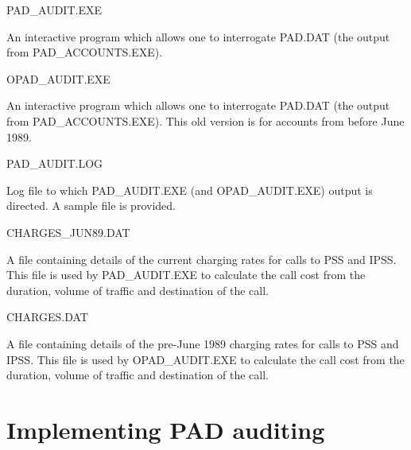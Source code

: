 \begin{list}{}{\setlength{\labelwidth}{\numlen}
\setlength{\leftmargin}{\numlen}
\addtolength{\leftmargin}{\labelsep}}
\item[PAD\_\/AUDIT.EXE]

An interactive program which allows one to
interrogate PAD.DAT (the output from 
PAD\_\/ACCOUNTS.EXE).

\item [OPAD\_\/AUDIT.EXE]

An interactive program which allows one to
interrogate PAD.DAT (the output from 
PAD\_\/ACCOUNTS.EXE). This old version is
for accounts from before June 1989.

\item [PAD\_\/AUDIT.LOG]

Log file to which PAD\_\/AUDIT.EXE 
(and OPAD\_\/AUDIT.EXE) output is
directed. A sample file is provided.

\item [CHARGES\_\/JUN89.DAT]

A file containing details of the current
charging rates for calls to PSS and IPSS.
This file is used by PAD\_\/AUDIT.EXE to calculate
the call cost from the duration, volume of
traffic and destination of the call.

\item [CHARGES.DAT]

A file containing details of the pre-June 1989
charging rates for calls to PSS and IPSS.
This file is used by OPAD\_\/AUDIT.EXE to calculate
the call cost from the duration, volume of
traffic and destination of the call.

\end {list}

\section {Implementing PAD auditing}

